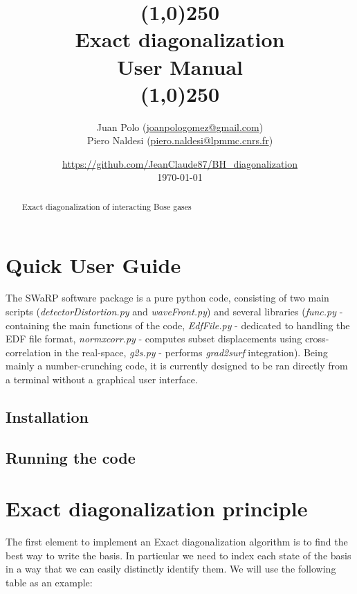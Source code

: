 \documentclass[paper=a4, fontsize=11pt]{scrartcl} %
\title{\line(1,0){250}\\Exact diagonalization\\User Manual\\\line(1,0){250}}
\author{Juan Polo (\url{joanpologomez@gmail.com}) \\ 
Piero Naldesi (\url{piero.naldesi@lpmmc.cnrs.fr})}
\affil{LPMMC, Grenoble, France}
\date{\url{https://github.com/JeanClaude87/BH_diagonalization}\\\today}
\numberwithin{equation}{section} %
\numberwithin{figure}{section} %
\numberwithin{table}{section} %
\begin{document}
\maketitle

\begin{abstract}
Exact diagonalization of interacting Bose gases
\end{abstract}

\tableofcontents

\clearpage

\section{Quick User Guide}

The SWaRP software package is a pure python code, consisting of two main scripts (\textit{detectorDistortion.py} and \textit{waveFront.py}) and several libraries (\textit{func.py} - containing the main functions of the code, \textit{EdfFile.py} - dedicated to handling the EDF file format, \textit{norm\textunderscore xcorr.py} - computes subset displacements using cross-correlation in the real-space, \textit{g2s.py} - performs \textit{grad2surf} integration). Being mainly a number-crunching code, it is currently designed to be ran directly from a terminal without a graphical user interface.

\subsection{Installation}


\subsection{Running the code}
\label{subsec:run}






\newpage

\section{Exact diagonalization principle}


The first element to implement an Exact diagonalization algorithm is to find the best way to write the basis. In particular we need to index each state of the basis in a way that we can easily distinctly identify them. We will use the following table as an example:
\end{document}
